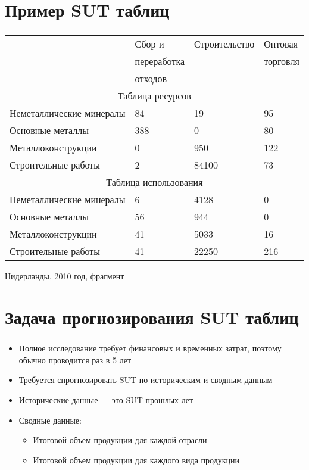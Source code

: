 \documentclass{beamer}
\begin{document}
\section{Пример SUT таблиц}
\begin{frame}
	\frametitle{\insertsection}
	
	\begin{center}
		\footnotesize{
		\begin{tabular}{|l|l|l|l|}
			\hline
			& Сбор и 		& Строительство & Оптовая  	\\
			& переработка 	&  				& торговля  \\
			& отходов 		&  				&   		\\
			\hline
			\multicolumn{4}{|c|}{Таблица ресурсов} \\
			\hline
			Неметаллические минералы  	& 84 & 19 & 95 \\
			Основные металлы  			& 388 & 0 & 80 \\
			Металлоконструкции  		& 0 & 950 & 122 \\
			Строительные работы  		& 2 & 84100 & 73 \\
			\hline
			\multicolumn{4}{|c|}{Таблица использования} \\
			\hline
			Неметаллические минералы  	& 6 & 4128 & 0 \\
			Основные металлы  			& 56 & 944 & 0 \\
			Металлоконструкции  		& 41 & 5033 & 16 \\
			Строительные работы  		& 41 & 22250 & 216 \\
			\hline
		\end{tabular}
		}
	\end{center}
	
	
	Нидерланды, 2010 год, фрагмент

\end{frame}

\section{Задача прогнозирования SUT таблиц}
\begin{frame}
	\frametitle{\insertsection}
	
	\begin{itemize}
	\item Полное исследование требует финансовых и временных затрат, поэтому обычно проводится раз в 5 лет
	\item Требуется спрогнозировать SUT по историческим и сводным данным
	\item Исторические данные — это SUT прошлых лет
	\item Сводные данные: 
	\begin{itemize}
	    \item Итоговой объем продукции для каждой отрасли
	    \item Итоговой объем продукции для каждого вида продукции
	\end{itemize}
	\end{itemize}

\end{frame}
\end{document}
